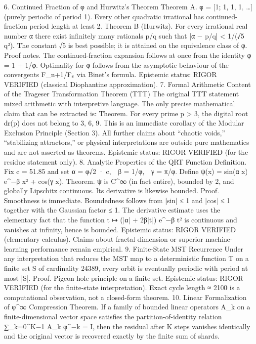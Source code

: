 {{{{{{6. Continued Fraction of φ and Hurwitz’s Theorem
Theorem A.
φ = [1; 1, 1, 1, …] (purely periodic of period 1).
Every other quadratic irrational has continued-fraction period length at least 2.
Theorem B (Hurwitz).
For every irrational real number α there exist infinitely many rationals p/q such that
|α − p/q| < 1/(√5 q²).
The constant √5 is best possible; it is attained on the equivalence class of φ.
Proof notes.
The continued-fraction expansion follows at once from the identity φ = 1 + 1/φ.
Optimality for φ follows from the asymptotic behaviour of the convergents F_{n+1}/Fₙ via Binet’s formula.
Epistemic status:
RIGOR VERIFIED (classical Diophantine approximation).
7. Formal Arithmetic Content of the Trageser Transformation Theorem (TTT)
The original TTT statement mixed arithmetic with interpretive language. The only precise mathematical claim that can be extracted is:
Theorem.
For every prime p > 3, the digital root dr(p) does not belong to {3, 6, 9}.
This is an immediate corollary of the Modular Exclusion Principle (Section 3).
All further claims about “chaotic voids,” “stabilizing attractors,” or physical interpretations are outside pure mathematics and are not asserted as theorems.
Epistemic status:
RIGOR VERIFIED (for the residue statement only).
8. Analytic Properties of the QRT Function
Definition.
Fix c = 51.85 and set
α = φ√2 · c, β = 1/φ, γ = π/φ.
Define
ψ(x) = sin(α x) e^{−β x²} + cos(γ x).
Theorem.
ψ is C^∞ (in fact entire), bounded by 2, and globally Lipschitz continuous. Its derivative is likewise bounded.
Proof.
Smoothness is immediate. Boundedness follows from |sin| ≤ 1 and |cos| ≤ 1 together with the Gaussian factor ≤ 1.
The derivative estimate uses the elementary fact that the function t ↦ (|α| + 2β|t|) e^{−β t²} is continuous and vanishes at infinity, hence is bounded.
Epistemic status:
RIGOR VERIFIED (elementary calculus).
Claims about fractal dimension or superior machine-learning performance remain empirical.
9. Finite-State MST Recurrence
Under any interpretation that reduces the MST map to a deterministic function T on a finite set S of cardinality 24389, every orbit is eventually periodic with period at most |S|.
Proof.
Pigeon-hole principle on a finite set.
Epistemic status:
RIGOR VERIFIED (for the finite-state interpretation).
Exact cycle length ≈ 2100 is a computational observation, not a closed-form theorem.
10. Linear Formalization of φ^∞ Compression
Theorem.
If a family of bounded linear operators {A_k} on a finite-dimensional vector space satisfies the partition-of-identity relation
∑_{k=0}^{K−1} A_k φ^{−k} = I,
then the residual after K steps vanishes identically and the original vector is recovered exactly by the finite sum of shards.
}}}}}}
